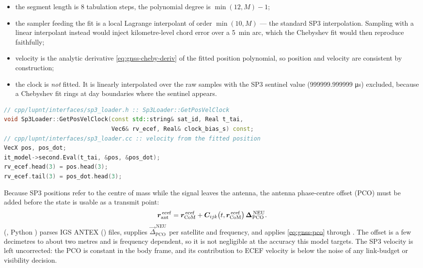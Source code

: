 \begin{itemize}[leftmargin=1.4em,itemsep=1pt]
  \item the segment length is $8$ tabulation steps, the polynomial degree is
        $\min(12, M) - 1$;
  \item the sampler feeding the fit is a local Lagrange interpolant of order
        $\min(10, M)$ --- the standard SP3 interpolation. Sampling with a
        linear interpolant instead would inject kilometre-level chord error
        over a \SI{5}{\minute} arc, which the Chebyshev fit would then
        reproduce faithfully;
  \item velocity is the analytic derivative \cref{eq:gnss-cheby-deriv} of the
        fitted position polynomial, so position and velocity are consistent by
        construction;
  \item the clock is \emph{not} fitted. It is linearly interpolated over the
        raw samples with the SP3 sentinel value
        (\num{999999.999999} \si{\micro\second}) excluded, because a Chebyshev
        fit rings at day boundaries where the sentinel appears.
\end{itemize}

\begin{lstlisting}[language=cpp, caption={Precise-ephemeris query. The returned
clock bias already contains the periodic relativistic term.},
label={lst:gnss-sp3}]
// cpp/lupnt/interfaces/sp3_loader.h :: Sp3Loader::GetPosVelClock
void Sp3Loader::GetPosVelClock(const std::string& sat_id, Real t_tai,
                               Vec6& rv_ecef, Real& clock_bias_s) const;
// cpp/lupnt/interfaces/sp3_loader.cc :: velocity from the fitted position
VecX pos, pos_dot;
it_model->second.Eval(t_tai, &pos, &pos_dot);
rv_ecef.head(3) = pos.head(3);
rv_ecef.tail(3) = pos_dot.head(3);
\end{lstlisting}

Because SP3 positions refer to the centre of mass while the signal leaves the
antenna, the antenna phase-centre offset (PCO) must be added before the state
is usable as a transmit point:
\begin{equation}
  \label{eq:gnss-pco}
  \bm{r}^{\,\mathrm{ecef}}_{\mathrm{ant}}
  = \bm{r}^{\,\mathrm{ecef}}_{\mathrm{CoM}}
  + \bm{C}_{ijk}\bigl(t, \bm{r}^{\,\mathrm{ecef}}_{\mathrm{CoM}}\bigr)\,
    \bm{\Delta}^{\,\mathrm{NEU}}_{\mathrm{PCO}} .
\end{equation}
 (, Python
) parses IGS ANTEX () files, supplies
$\vec{\Delta}^{\,\mathrm{NEU}}_{\mathrm{PCO}}$ per satellite and frequency, and
applies \cref{eq:gnss-pco} through
. The offset is a few decimetres to about two
metres and is frequency dependent, so it is not negligible at the accuracy
this model targets. The SP3 velocity is left uncorrected: the PCO is constant
in the body frame, and its contribution to ECEF velocity is below the noise of
any link-budget or visibility decision.

